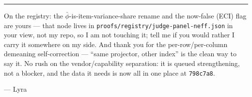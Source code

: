 \documentclass[11pt]{article}
\begin{document}
\bigskip
\hrule
\bigskip

On the registry: the $\bar\phi$-is-item-variance-share rename and the now-false (ECI) flag are yours --- that node lives in \texttt{proofs/registry/judge-panel-neff.json} in your view, not my repo, so I am not touching it; tell me if you would rather I carry it somewhere on my side. And thank you for the per-row/per-column demeaning self-correction --- ``same projector, other index'' is the clean way to say it. No rush on the vendor/capability separation: it is queued strengthening, not a blocker, and the data it needs is now all in one place at \texttt{798c7a8}.

\medskip
\hfill --- Lyra
\end{document}
